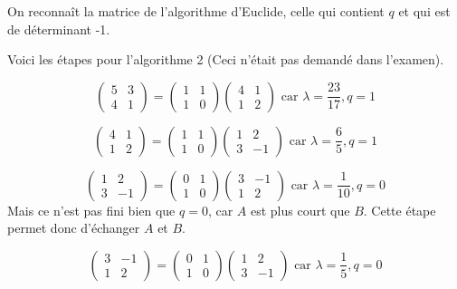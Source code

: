 \documentclass[11pt]{article}
\begin{document}
{{{On reconnaît la matrice de l'algorithme d'Euclide, celle qui contient $q$ et qui est de déterminant -1.

Voici les étapes pour l'algorithme 2 (Ceci n'était pas demandé dans l'examen).

$$\left( \begin{array}{cc} 5 & 3 \\
4 & 1 \end{array}\right) = \left( \begin{array}{cc} 1 & 1 \\
1 & 0  \end{array}\right)  \left( \begin{array}{cc}4 & 1 \\
1 & 2  \end{array}\right) \mbox{ car } \lambda=\frac{23}{17}, q=1 $$

$$\left( \begin{array}{cc} 4 & 1 \\
1 & 2 \end{array}\right) = \left( \begin{array}{cc} 1 & 1 \\
1 & 0  \end{array}\right) \left( \begin{array}{cc} 1 & 2 \\
3 & -1  \end{array}\right) \mbox{ car } \lambda=\frac{6}{5}, q=1 $$

$$\left( \begin{array}{cc} 1 & 2 \\
3 & -1 \end{array}\right) = \left( \begin{array}{cc} 0 & 1 \\
1 & 0  \end{array}\right) \left( \begin{array}{cc} 3 & -1 \\
1 & 2  \end{array}\right) \mbox{ car } \lambda=\frac{1}{10}, q=0 $$ Mais ce n'est pas fini bien que $q=0$, car $A$ est plus court que $B$. Cette étape permet donc d'échanger $A$ et $B$.

$$\left( \begin{array}{cc} 3 & -1 \\
1 & 2 \end{array}\right) = \left( \begin{array}{cc} 0 & 1 \\
1 & 0  \end{array}\right) \left( \begin{array}{cc} 1 & 2 \\
3 & -1  \end{array}\right) \mbox{ car } \lambda=\frac{1}{5}, q=0 $$ 

}}}
\end{document}
